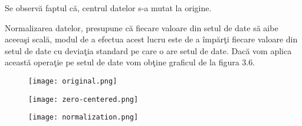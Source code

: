 Se observ\u{a} faptul c\u{a}, centrul datelor s-a mutat la origine.

Normalizarea datelor, presupune c\u{a} fiecare valoare din setul de date s\u{a} aibe aceea\c{s}i scal\u{a}, modul de a efectua acest lucru este de a \^{i}mp\u{a}r\c{t}i fiecare valoare din setul de date cu devia\c{t}ia standard pe care o are setul de date. Dac\u{a} vom aplica aceast\u{a} opera\c{t}ie pe setul de date vom ob\c{t}ine graficul de la figura 3.6.

\begin{figure}[h!]
  \centering
  \texttt{[image: original.png]}
\end{figure}

\begin{figure}[h!]
  \centering
  \texttt{[image: zero-centered.png]}
\end{figure}

\begin{figure}[h!]
  \centering
  \texttt{[image: normalization.png]}
\end{figure}
